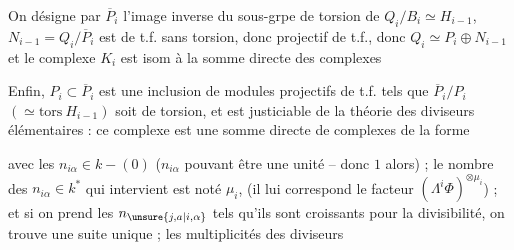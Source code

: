 
On désigne par $\overline P_i$ l'image inverse  du sous-grpe de torsion de $Q_i/B_i\simeq H_{i-1}$, $N_{i-1}=Q_i/\overline P_i$ est de t.f. sans torsion, donc  projectif de t.f., donc $Q_i\simeq P_i\oplus N_{i-1}$ et le complexe $K_i$ est isom à la somme directe des complexes


Enfin, $P_i\subset\overline P_i$ est une inclusion de modules projectifs de t.f. tels que $\overline P_i/P_i$ $(\simeq\mathrm{tors}\ H_{i-1})$ soit de torsion, et est justiciable de la théorie des diviseurs élémentaires :   ce  complexe est une somme directe de complexes de la forme


avec les $n_{i\alpha}\in k-(0)$ ($n_{i\alpha}$ pouvant être une unité -- donc $1$ alors) ; le nombre des $n_{i\alpha}\in k^{*}$ qui intervient est noté $\mu_i$, (il lui correspond le facteur $(\Lambda^{i}\Phi)^{\otimes\mu_i}$) ; et si on prend les  $n_{\unsure{j,a|i,\alpha}}$ tels qu'ils sont croissants pour la divisibilité, on trouve une suite unique ; les multiplicités  des diviseurs 

